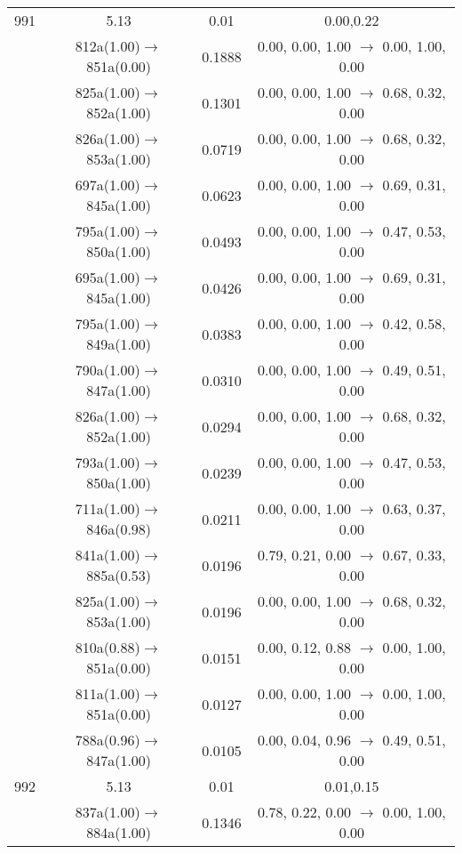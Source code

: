 \documentclass[10pt,a4paper]{article}
\begin{document}
\begin{longtable}{c|c|c|c}
 \hline991 &	 5.13 &	 0.01 &	 0.00,0.22 \\ 
  	& 812a(1.00)$\rightarrow$851a(0.00) &	 0.1888 &	 0.00, 0.00, 1.00 $\rightarrow$ 0.00, 1.00, 0.00 \\ 
 	& 825a(1.00)$\rightarrow$852a(1.00) &	 0.1301 &	 0.00, 0.00, 1.00 $\rightarrow$ 0.68, 0.32, 0.00 \\ 
 	& 826a(1.00)$\rightarrow$853a(1.00) &	 0.0719 &	 0.00, 0.00, 1.00 $\rightarrow$ 0.68, 0.32, 0.00 \\ 
 	& 697a(1.00)$\rightarrow$845a(1.00) &	 0.0623 &	 0.00, 0.00, 1.00 $\rightarrow$ 0.69, 0.31, 0.00 \\ 
 	& 795a(1.00)$\rightarrow$850a(1.00) &	 0.0493 &	 0.00, 0.00, 1.00 $\rightarrow$ 0.47, 0.53, 0.00 \\ 
 	& 695a(1.00)$\rightarrow$845a(1.00) &	 0.0426 &	 0.00, 0.00, 1.00 $\rightarrow$ 0.69, 0.31, 0.00 \\ 
 	& 795a(1.00)$\rightarrow$849a(1.00) &	 0.0383 &	 0.00, 0.00, 1.00 $\rightarrow$ 0.42, 0.58, 0.00 \\ 
 	& 790a(1.00)$\rightarrow$847a(1.00) &	 0.0310 &	 0.00, 0.00, 1.00 $\rightarrow$ 0.49, 0.51, 0.00 \\ 
 	& 826a(1.00)$\rightarrow$852a(1.00) &	 0.0294 &	 0.00, 0.00, 1.00 $\rightarrow$ 0.68, 0.32, 0.00 \\ 
 	& 793a(1.00)$\rightarrow$850a(1.00) &	 0.0239 &	 0.00, 0.00, 1.00 $\rightarrow$ 0.47, 0.53, 0.00 \\ 
 	& 711a(1.00)$\rightarrow$846a(0.98) &	 0.0211 &	 0.00, 0.00, 1.00 $\rightarrow$ 0.63, 0.37, 0.00 \\ 
 	& 841a(1.00)$\rightarrow$885a(0.53) &	 0.0196 &	 0.79, 0.21, 0.00 $\rightarrow$ 0.67, 0.33, 0.00 \\ 
 	& 825a(1.00)$\rightarrow$853a(1.00) &	 0.0196 &	 0.00, 0.00, 1.00 $\rightarrow$ 0.68, 0.32, 0.00 \\ 
 	& 810a(0.88)$\rightarrow$851a(0.00) &	 0.0151 &	 0.00, 0.12, 0.88 $\rightarrow$ 0.00, 1.00, 0.00 \\ 
 	& 811a(1.00)$\rightarrow$851a(0.00) &	 0.0127 &	 0.00, 0.00, 1.00 $\rightarrow$ 0.00, 1.00, 0.00 \\ 
 	& 788a(0.96)$\rightarrow$847a(1.00) &	 0.0105 &	 0.00, 0.04, 0.96 $\rightarrow$ 0.49, 0.51, 0.00 \\ 
 \hline992 &	 5.13 &	 0.01 &	 0.01,0.15 \\ 
  	& 837a(1.00)$\rightarrow$884a(1.00) &	 0.1346 &	 0.78, 0.22, 0.00 $\rightarrow$ 0.00, 1.00, 0.00 \\ 

\end{longtable}
\end{document}
